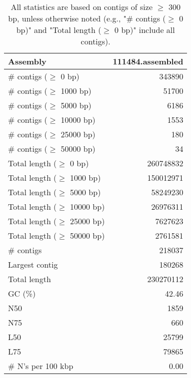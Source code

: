 \documentclass[12pt,a4paper]{article}
\begin{document}
\begin{table}[ht]
\begin{center}
\caption{All statistics are based on contigs of size $\geq$ 300 bp, unless otherwise noted (e.g., "\# contigs ($\geq$ 0 bp)" and "Total length ($\geq$ 0 bp)" include all contigs).}
\begin{tabular}{|l*{1}{|r}|}
\hline
Assembly & 111484.assembled \\ \hline
\# contigs ($\geq$ 0 bp) & 343890 \\ \hline
\# contigs ($\geq$ 1000 bp) & 51700 \\ \hline
\# contigs ($\geq$ 5000 bp) & 6186 \\ \hline
\# contigs ($\geq$ 10000 bp) & 1553 \\ \hline
\# contigs ($\geq$ 25000 bp) & 180 \\ \hline
\# contigs ($\geq$ 50000 bp) & 34 \\ \hline
Total length ($\geq$ 0 bp) & 260748832 \\ \hline
Total length ($\geq$ 1000 bp) & 150012971 \\ \hline
Total length ($\geq$ 5000 bp) & 58249230 \\ \hline
Total length ($\geq$ 10000 bp) & 26976311 \\ \hline
Total length ($\geq$ 25000 bp) & 7627623 \\ \hline
Total length ($\geq$ 50000 bp) & 2761581 \\ \hline
\# contigs & 218037 \\ \hline
Largest contig & 180268 \\ \hline
Total length & 230270112 \\ \hline
GC (\%) & 42.46 \\ \hline
N50 & 1859 \\ \hline
N75 & 660 \\ \hline
L50 & 25799 \\ \hline
L75 & 79865 \\ \hline
\# N's per 100 kbp & 0.00 \\ \hline
\end{tabular}
\end{center}
\end{table}
\end{document}
